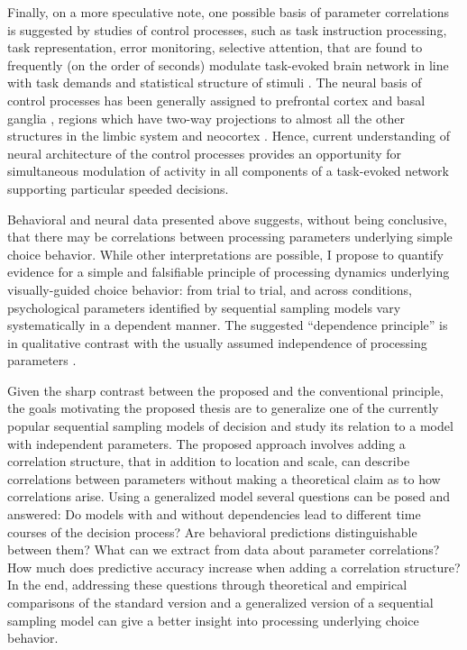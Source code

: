 \documentclass[12pt]{report}
\begin{document}
Finally, on a more speculative note, one possible basis of parameter correlations is suggested by studies of control processes, such as task instruction processing, task representation, error monitoring, selective attention, that are found to frequently (on the order of seconds) modulate task-evoked brain network in line with task demands and statistical structure of stimuli \citep{MozKin2007,JonKin2009,ColFra2013}. The neural basis of control processes has been generally assigned to prefrontal cortex and basal ganglia \citep{SchAar2010}, regions which have two-way projections to almost all the other structures in the limbic system and neocortex \citep{MilCoh2001,CalPic2014}. Hence, current understanding of neural architecture of the control processes provides an opportunity for simultaneous modulation of activity in all components of a task-evoked network supporting particular speeded decisions. 

Behavioral and neural data presented above suggests, without being conclusive, that there may be correlations between processing parameters underlying simple choice behavior. While other interpretations are possible, I propose to quantify evidence for a simple and falsifiable principle of processing dynamics underlying visually-guided choice behavior: from trial to trial, and across conditions, psychological parameters identified by sequential sampling models vary systematically in a dependent manner. The suggested ``dependence principle'' is in qualitative contrast with the usually assumed independence of processing parameters \citep{RatSmi2004}. 

Given the sharp contrast between the proposed and the conventional principle, the goals motivating the proposed thesis are to generalize one of the currently popular sequential sampling models of decision and study its relation to a model with independent parameters. The proposed approach involves adding a correlation structure, that in addition to location and scale, can describe correlations between parameters without making a theoretical claim as to how correlations arise. Using a generalized model several questions can be posed and answered: Do models with and without dependencies lead to different time courses of the decision process? Are behavioral predictions distinguishable between them?  What can we extract from data about parameter correlations? How much does predictive accuracy increase when adding a correlation structure? In the end, addressing these questions through theoretical and empirical comparisons of the standard version and a generalized version of a sequential sampling model can give a better insight into processing underlying choice behavior.
\end{document}
